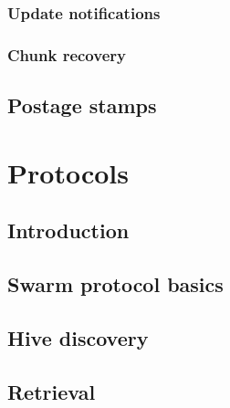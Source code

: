 \subsection{Update notifications \statusred}\label{spec:format:update-notifications}
%

\subsection{Chunk recovery  \statusyellow}\label{spec:format:recovery}


\section{Postage stamps \statusorange}\label{spec:format:postage-stamps}

%


\chapter{Protocols}\label{spec:protocol}

\section{Introduction \statusorange}\label{spec:protocol:intro}


\section{Swarm protocol basics\statusgreen}\label{spec:protocol:basics}


\section{Hive discovery  \statusgreen}\label{spec:protocol:hive}


\section{Retrieval  \statusorange  \statuspriority}\label{spec:protocol:retrieval}


